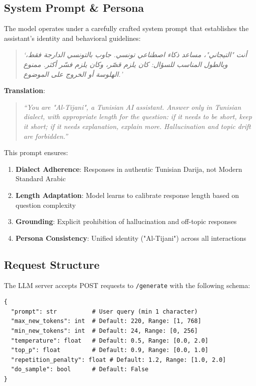 \documentclass[12pt,a4paper]{report}
\begin{document}
\subsection{System Prompt \& Persona}

The model operates under a carefully crafted system prompt that establishes the assistant's identity and behavioral guidelines:

\begin{quote}
\textit{`أنت "التيجاني"، مساعد ذكاء اصطناعي تونسي. جاوب بالتونسي الدارجة فقط، وبالطول المناسب للسؤال: كان يلزم قصّر، وكان يلزم فسّر أكثر. ممنوع الهلوسة أو الخروج على الموضوع.'}
\end{quote}

\textbf{Translation}:
\begin{quote}
\textit{``You are "Al-Tijani", a Tunisian AI assistant. Answer only in Tunisian dialect, with appropriate length for the question: if it needs to be short, keep it short; if it needs explanation, explain more. Hallucination and topic drift are forbidden.''}
\end{quote}

This prompt ensures:
\begin{enumerate}
    \item \textbf{Dialect Adherence}: Responses in authentic Tunisian Darija, not Modern Standard Arabic
    \item \textbf{Length Adaptation}: Model learns to calibrate response length based on question complexity
    \item \textbf{Grounding}: Explicit prohibition of hallucination and off-topic responses
    \item \textbf{Persona Consistency}: Unified identity ("Al-Tijani") across all interactions
\end{enumerate}

\subsection{Request Structure}

The LLM server accepts POST requests to \texttt{/generate} with the following schema:

\begin{verbatim}
{
  "prompt": str          # User query (min 1 character)
  "max_new_tokens": int  # Default: 220, Range: [1, 768]
  "min_new_tokens": int  # Default: 24, Range: [0, 256]
  "temperature": float   # Default: 0.5, Range: [0.0, 2.0]
  "top_p": float         # Default: 0.9, Range: [0.0, 1.0]
  "repetition_penalty": float # Default: 1.2, Range: [1.0, 2.0]
  "do_sample": bool      # Default: False
}
\end{verbatim}
\end{document}
